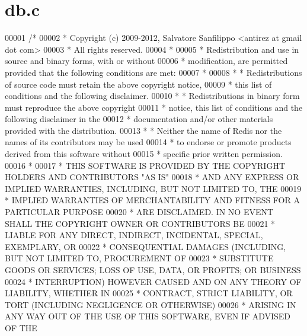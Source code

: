 \hypertarget{db_8c_source}{}\section{db.\+c}
\label{db_8c_source}

\begin{DoxyCode}
00001 \textcolor{comment}{/*}
00002 \textcolor{comment}{ * Copyright (c) 2009-2012, Salvatore Sanfilippo <antirez at gmail dot com>}
00003 \textcolor{comment}{ * All rights reserved.}
00004 \textcolor{comment}{ *}
00005 \textcolor{comment}{ * Redistribution and use in source and binary forms, with or without}
00006 \textcolor{comment}{ * modification, are permitted provided that the following conditions are met:}
00007 \textcolor{comment}{ *}
00008 \textcolor{comment}{ *   * Redistributions of source code must retain the above copyright notice,}
00009 \textcolor{comment}{ *     this list of conditions and the following disclaimer.}
00010 \textcolor{comment}{ *   * Redistributions in binary form must reproduce the above copyright}
00011 \textcolor{comment}{ *     notice, this list of conditions and the following disclaimer in the}
00012 \textcolor{comment}{ *     documentation and/or other materials provided with the distribution.}
00013 \textcolor{comment}{ *   * Neither the name of Redis nor the names of its contributors may be used}
00014 \textcolor{comment}{ *     to endorse or promote products derived from this software without}
00015 \textcolor{comment}{ *     specific prior written permission.}
00016 \textcolor{comment}{ *}
00017 \textcolor{comment}{ * THIS SOFTWARE IS PROVIDED BY THE COPYRIGHT HOLDERS AND CONTRIBUTORS "AS IS"}
00018 \textcolor{comment}{ * AND ANY EXPRESS OR IMPLIED WARRANTIES, INCLUDING, BUT NOT LIMITED TO, THE}
00019 \textcolor{comment}{ * IMPLIED WARRANTIES OF MERCHANTABILITY AND FITNESS FOR A PARTICULAR PURPOSE}
00020 \textcolor{comment}{ * ARE DISCLAIMED. IN NO EVENT SHALL THE COPYRIGHT OWNER OR CONTRIBUTORS BE}
00021 \textcolor{comment}{ * LIABLE FOR ANY DIRECT, INDIRECT, INCIDENTAL, SPECIAL, EXEMPLARY, OR}
00022 \textcolor{comment}{ * CONSEQUENTIAL DAMAGES (INCLUDING, BUT NOT LIMITED TO, PROCUREMENT OF}
00023 \textcolor{comment}{ * SUBSTITUTE GOODS OR SERVICES; LOSS OF USE, DATA, OR PROFITS; OR BUSINESS}
00024 \textcolor{comment}{ * INTERRUPTION) HOWEVER CAUSED AND ON ANY THEORY OF LIABILITY, WHETHER IN}
00025 \textcolor{comment}{ * CONTRACT, STRICT LIABILITY, OR TORT (INCLUDING NEGLIGENCE OR OTHERWISE)}
00026 \textcolor{comment}{ * ARISING IN ANY WAY OUT OF THE USE OF THIS SOFTWARE, EVEN IF ADVISED OF THE}

\end{DoxyCode}
